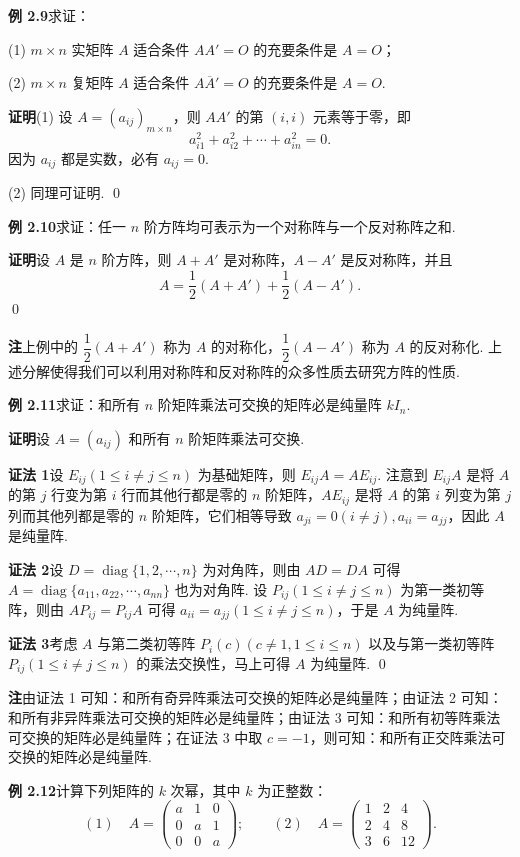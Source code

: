 \documentclass[UTF8, 12pt, fontset=fandol, oneside]{ctexart}
\begin{document}
\noindent\textbf{例 2.9}\quad 求证：

(1) $m\times n$ 实矩阵 $A$ 适合条件 $AA'=O$ 的充要条件是 $A=O$；

(2) $m\times n$ 复矩阵 $A$ 适合条件 $A\overline A'=O$ 的充要条件是 $A=O$.

\noindent\textbf{证明}\quad (1) 设 $A=(a_{ij})_{m\times n}$，则 $AA'$ 的第 $(i,i)$ 元素等于零，即
\[
a_{i1}^2+a_{i2}^2+\cdots+a_{in}^2=0.
\]
因为 $a_{ij}$ 都是实数，必有 $a_{ij}=0$.

(2) 同理可证明. \qed

\noindent\textbf{例 2.10}\quad 求证：任一 $n$ 阶方阵均可表示为一个对称阵与一个反对称阵之和.

\noindent\textbf{证明}\quad 设 $A$ 是 $n$ 阶方阵，则 $A+A'$ 是对称阵，$A-A'$ 是反对称阵，并且
\[
A=\frac12(A+A')+\frac12(A-A').
\]
\qed

\noindent\textbf{注}\quad 上例中的 $\dfrac12(A+A')$ 称为 $A$ 的对称化，$\dfrac12(A-A')$ 称为 $A$ 的反对称化. 上述分解使得我们可以利用对称阵和反对称阵的众多性质去研究方阵的性质.

\noindent\textbf{例 2.11}\quad 求证：和所有 $n$ 阶矩阵乘法可交换的矩阵必是纯量阵 $kI_n$.

\noindent\textbf{证明}\quad 设 $A=(a_{ij})$ 和所有 $n$ 阶矩阵乘法可交换.

\noindent\textbf{证法 1}\quad 设 $E_{ij}(1\le i\ne j\le n)$ 为基础矩阵，则 $E_{ij}A=AE_{ij}$. 注意到 $E_{ij}A$ 是将 $A$ 的第 $j$ 行变为第 $i$ 行而其他行都是零的 $n$ 阶矩阵，$AE_{ij}$ 是将 $A$ 的第 $i$ 列变为第 $j$ 列而其他列都是零的 $n$ 阶矩阵，它们相等导致 $a_{ji}=0(i\ne j),a_{ii}=a_{jj}$，因此 $A$ 是纯量阵.

\noindent\textbf{证法 2}\quad 设 $D=\operatorname{diag}\{1,2,\cdots,n\}$ 为对角阵，则由 $AD=DA$ 可得 $A=\operatorname{diag}\{a_{11},a_{22},\cdots,a_{nn}\}$ 也为对角阵. 设 $P_{ij}(1\le i\ne j\le n)$ 为第一类初等阵，则由 $AP_{ij}=P_{ij}A$ 可得 $a_{ii}=a_{jj}(1\le i\ne j\le n)$，于是 $A$ 为纯量阵.

\noindent\textbf{证法 3}\quad 考虑 $A$ 与第二类初等阵 $P_i(c)(c\ne1,1\le i\le n)$ 以及与第一类初等阵 $P_{ij}(1\le i\ne j\le n)$ 的乘法交换性，马上可得 $A$ 为纯量阵. \qed

\noindent\textbf{注}\quad 由证法 1 可知：和所有奇异阵乘法可交换的矩阵必是纯量阵；由证法 2 可知：和所有非异阵乘法可交换的矩阵必是纯量阵；由证法 3 可知：和所有初等阵乘法可交换的矩阵必是纯量阵；在证法 3 中取 $c=-1$，则可知：和所有正交阵乘法可交换的矩阵必是纯量阵.

\noindent\textbf{例 2.12}\quad 计算下列矩阵的 $k$ 次幂，其中 $k$ 为正整数：
\[
(1)\quad
A=\left(
\begin{array}{ccc}
a & 1 & 0\\
0 & a & 1\\
0 & 0 & a
\end{array}
\right);
\qquad
(2)\quad
A=\left(
\begin{array}{ccc}
1 & 2 & 4\\
2 & 4 & 8\\
3 & 6 & 12
\end{array}
\right).
\]
\end{document}
